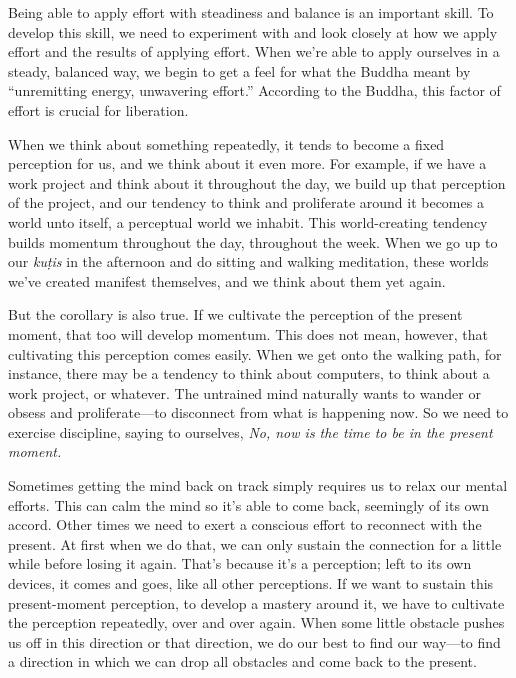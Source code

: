 Being able to apply effort with steadiness and balance is an important 
skill. To develop this skill, we need to experiment with and look 
closely at how we apply effort and the results of applying effort. When 
we're able to apply ourselves in a steady, balanced way, we begin to 
get a feel for what the Buddha meant by ``unremitting energy, 
unwavering effort.'' According to the Buddha, this factor of effort is 
crucial for liberation.


When we think about something repeatedly, it tends to become a fixed 
perception for us, and we think about it even more. For example, if we 
have a work project and think about it throughout the day, we build up 
that perception of the project, and our tendency to think and 
proliferate around it becomes a world unto itself, a perceptual world 
we inhabit. This world-creating tendency builds momentum throughout the 
day, throughout the week. When we go up to our \emph{kuṭis} in the 
afternoon and do sitting and walking meditation, these worlds we've 
created manifest themselves, and we think about them yet again.

But the corollary is also true. If we cultivate the perception of the 
present moment, that too will develop momentum. This does not mean, 
however, that cultivating this perception comes easily. When we get 
onto the walking path, for instance, there may be a tendency to think 
about computers, to think about a work project, or whatever. The 
untrained mind naturally wants to wander or obsess and proliferate---to 
disconnect from what is happening now. So we need to exercise 
discipline, saying to ourselves, \emph{No, now is the time to be in the 
present moment.}

Sometimes getting the mind back on track simply requires us to relax 
our mental efforts. This can calm the mind so it's able to come back, 
seemingly of its own accord. Other times we need to exert a conscious 
effort to reconnect with the present. At first when we do that, we can 
only sustain the connection for a little while before losing it again. 
That's because it's a perception; left to its own devices, it comes and 
goes, like all other perceptions. If we want to sustain this 
present-moment perception, to develop a mastery around it, we have to 
cultivate the perception repeatedly, over and over again. When some 
little obstacle pushes us off in this direction or that direction, we 
do our best to find our way---to find a direction in which we can drop 
all obstacles and come back to the present.

